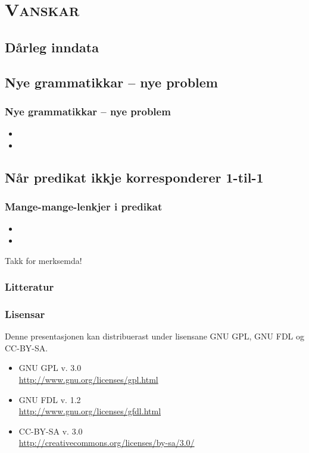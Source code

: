 \documentclass[xcolor=x11names,compress,bigger]{beamer}
\renewcommand{\(}{\begin{columns}}
\renewcommand{\)}{\end{columns}}
\newcommand{\<}[1]{\begin{column}{#1}}
\renewcommand{\>}{\end{column}}
\begin{document}
\section{\scshape Vanskar}
\subsection{Dårleg inndata}
\subsection{Nye grammatikkar -- nye problem}
\begin{frame}\frametitle{Nye grammatikkar -- nye problem}
  \begin{itemize}
  \item 
  \item 
  \end{itemize}
\end{frame}


\subsection{Når predikat ikkje korresponderer 1-til-1}
\begin{frame}\frametitle{Mange-mange-lenkjer i predikat}
  \begin{itemize}
  \item 
  \item 
  \end{itemize}
\end{frame}



\begin{frame}
  \begin{center}
    {\huge Takk for merksemda!}
  \end{center}
\end{frame}

\begin{frame}\frametitle{Litteratur}
  \nocite{dyvik2009lmp}
  
  
\end{frame}

\begin{frame}\frametitle{Lisensar}
  Denne presentasjonen kan distribuerast under lisensane
  GNU GPL, GNU FDL og CC-BY-SA.
  \begin{itemize}
  \item GNU GPL v. 3.0 \\
    \href{http://www.gnu.org/licenses/gpl.html}{http://www.gnu.org/licenses/gpl.html}
  \item GNU FDL v. 1.2 \\
    \href{http://www.gnu.org/licenses/gfdl.html}{http://www.gnu.org/licenses/gfdl.html}
  \item CC-BY-SA v. 3.0 \\
    \href{http://creativecommons.org/licenses/by-sa/3.0/}{http://creativecommons.org/licenses/by-sa/3.0/}
  \end{itemize}
\end{frame}
\end{document}
